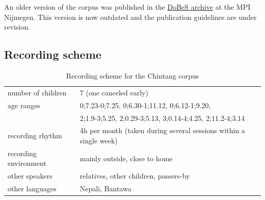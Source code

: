 \documentclass[a4paper, 11pt]{book}
\begin{document}
An older version of the corpus was published in the \href{http://dobes.mpi.nl/}{DoBeS archive} at the MPI Nijmegen. This version is now outdated and the publication guidelines are under revision. 

\subsection{Recording scheme}

\begin{table}[ht]
	\centering
	\begin{tabular}{ll}
		\toprule
		number of children 	& 7 (one canceled early) \\
		age ranges 			& 0;7.23-0;7.25, 0;6.30-1;11.12, 0;6.12-1;9.20, \\
							& 2;1.9-3;5.25, 2;0.29-3;5.13, 3;0.14-4;4.25, 2;11.2-4;3.14 \\
		recording rhythm 	& 4h per month (taken during several sessions within a single week) \\
		recording environment & mainly outside, close to home \\
		other speakers		& relatives, other children, passers-by \\
		other languages		& Nepali, Bantawa \\
		\bottomrule		
	\end{tabular}
	\caption{Recording scheme for the Chintang corpus}
	\label{tab:Chintang recording scheme}
\end{table}


%
%
\end{document}

